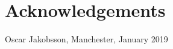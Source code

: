 \thispagestyle{plain}			%
\section*{Acknowledgements}


\vspace{1.5cm}
\hfill
Oscar Jakobsson, Manchester, January 2019

